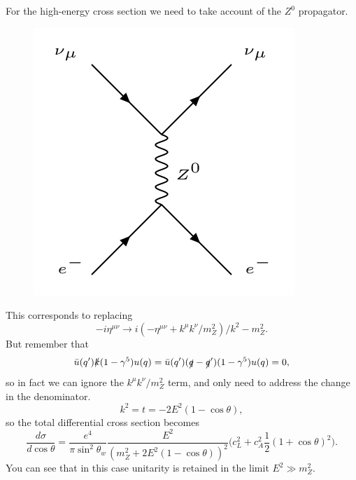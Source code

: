For the high-energy cross section we need to take account of the $Z^0$ propagator.
\begin{figure}
  \includegraphics[width=\linewidth]{figs/25a.png}
\end{figure}
This corresponds to replacing 
\begin{equation}
-i\eta^{\mu\nu} \to i(-\eta^{\mu\nu} + k^\mu k^\nu/m_Z^2)/k^2-m_Z^2.
\end{equation} 
But remember that 
\begin{equation}
\bar{u}(q^\prime)\slashed{k}(1-\gamma^5)u(q) = \bar{u}(q^\prime)(\slashed{q}-\slashed{q}^\prime)(1-\gamma^5)u(q)=0,
\end{equation}
so in fact we can ignore the $k^\mu k^\nu/m_Z^2$ term, and only need to address the change in the denominator. 
\begin{equation}
k^2 = t = -2E^2(1-\cos\theta),
\end{equation}
so the total differential cross section becomes
\begin{equation}
\frac{d\sigma}{d\cos\theta} = \frac{e^4}{\pi\sin^2\theta_w}\frac{E^2}{(m_Z^2 + 2E^2(1-\cos\theta))^2}\big(c_L^2 + c_A^2 \frac{1}{2}(1+\cos\theta)^2\big).
\end{equation}
You can see that in this case unitarity is retained in the limit $E^2 \gg m_Z^2$.
%
